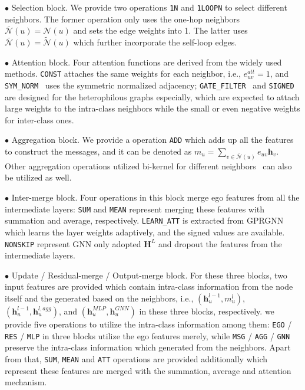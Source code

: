 \documentclass[sigconf]{acmart}
\def\bH{\textbf{H}}
\def\bh{\textbf{h}}
\begin{document}
$\bullet$ Selection block. We provide two operations \texttt{1N} and \texttt{1LOOPN} to select different neighbors. The former operation only uses the one-hop neighbors $\bar{\mathcal{N}}(u) = \mathcal{N}(u)$ and sets the edge weights into 1. The latter uses $\bar{\mathcal{N}}(u) = \tilde{\mathcal{N}}(u)$ which further incorporate the self-loop edges. 


$\bullet$ Attention block. Four attention functions are derived from the widely used methods.
\texttt{CONST} attaches the same weights for each neighbor, i.e., $e_{uv}^{att} = 1$, and \texttt{SYM\_NORM}~\cite{kipf2016semi} uses the symmetric normalized adjacency;  \texttt{GATE\_FILTER}~\cite{bo2021beyond} and \texttt{SIGNED}~\cite{yan2021two} are designed for the heterophilous graphs especially, which are expected to attach large weights to the intra-class neighbors while the small or even negative weights for inter-class ones.



$\bullet$ Aggregation block. We provide a operation \texttt{ADD} which adds up all the features to construct the messages, and it can be denoted as $m_u = \sum _{v \in \bar{\mathcal{N}}(u)}{e_{uv}\bh_v}$. Other aggregation operations utilized bi-kernel for different neighbors~\cite{du2022gbk} can also be utilized as well. 







$\bullet$ Inter-merge block. Four operations in this block merge ego features from all the intermediate layers: \texttt{SUM} and \texttt{MEAN} represent merging these features with summation and average, respectively. \texttt{LEARN\_ATT} is extracted from GPRGNN~\cite{chien2020adaptive} which learns the layer weights adaptively, and the signed values are available. \texttt{NONSKIP} represent GNN only adopted $\bH^L$ and dropout the features from the intermediate layers.




$\bullet$ Update / Residual-merge / Output-merge block. For these three blocks, two input features are provided which contain intra-class information from the node itself and the generated based on the neighbors, i.e., $(\bh_u^{l-1}, m_u^l)$, $(\bh_u^{l-1}, \bh_u^{l,agg})$, and $(\bh_u^{MLP}, \bh_u^{GNN})$ in these three blocks, respectively.
we provide five operations to utilize the intra-class information among them: \texttt{EGO} / \texttt{RES} / \texttt{MLP} in three blocks utilize the ego features merely, while \texttt{MSG} / \texttt{AGG} / \texttt{GNN} preserve the intra-class information which generated from the neighbors. Apart from that, \texttt{SUM}, \texttt{MEAN} and \texttt{ATT} operations are provided additionally which represent these features are merged with the summation, average and attention mechanism.
\end{document}
